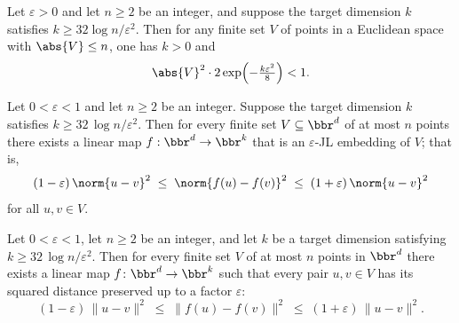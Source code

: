 \begin{lemma}
\label{jl_failure_bound_of_dim}
\leanok
{}
Let $\varepsilon > 0$ and let $n \ge 2$ be an integer, and suppose the target dimension
$k$ satisfies $k \ge 32 \log n / \varepsilon^2$. Then for any finite set $V$ of points
in a Euclidean space with $\abs{V} \le n$, one has $k > 0$ and \[ \abs{V}^2 \cdot
2\exp\!\left(-\tfrac{k\varepsilon^2}{8}\right) < 1. \]
\end{lemma}

\begin{theorem}
\label{johnson_lindenstrauss}
\leanok
{}
Let $0 < \varepsilon < 1$ and let $n \ge 2$ be an integer. Suppose the target dimension
$k$ satisfies $k \ge 32\,\log n / \varepsilon^2$. Then for every finite set $V \subseteq
\bbr^d$ of at most $n$ points there exists a linear map $f : \bbr^d \to \bbr^k$ that is
an $\varepsilon$-JL embedding of $V$; that is,
\[
(1 - \varepsilon)\,\norm{u - v}^2 \;\le\; \norm{f(u) - f(v)}^2 \;\le\; (1 +
\varepsilon)\,\norm{u - v}^2
\]
for all $u, v \in V$.
\end{theorem}

\begin{theorem}
\label{johnson_lindenstrauss_subgaussian}
\leanok
{}
Let $0 < \varepsilon < 1$, let $n \ge 2$ be an integer, and let $k$ be a target
dimension satisfying $k \ge 32\,\log n / \varepsilon^2$. Then for every finite set $V$
of at most $n$ points in $\bbr^d$ there exists a linear map $f \colon \bbr^d \to \bbr^k$
such that every pair $u, v \in V$ has its squared distance preserved up to a factor
$\varepsilon$:
\[
(1 - \varepsilon)\,\|u - v\|^2 \;\le\; \|f(u) - f(v)\|^2 \;\le\; (1 + \varepsilon)\,\|u
- v\|^2.
\]
\end{theorem}

